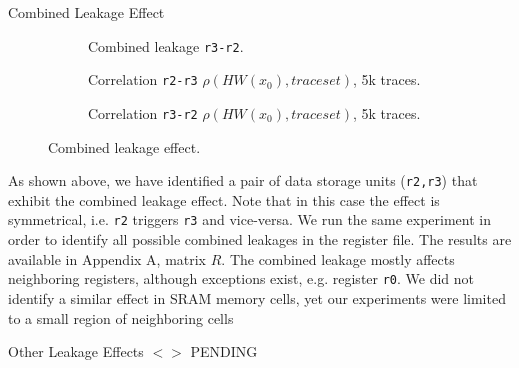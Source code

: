 \begin{subsection}{Combined Leakage Effect}
\begin{figure}[H]
\begin{subfigure}[b]{0.4\textwidth}
        \caption{\scriptsize{Combined leakage \texttt{r3-r2}.}}

    \end{subfigure}


 \begin{subfigure}[b]{0.47\textwidth}

        \caption{\scriptsize{Correlation \texttt{r2-r3} $\rho(HW(x_0),traceset)$, 5k traces.}}

    \end{subfigure}
 \begin{subfigure}[b]{0.47\textwidth}

        \caption{\scriptsize{Correlation \texttt{r3-r2} $\rho(HW(x_0),traceset)$, 5k traces.}}

    \end{subfigure}

   
    \caption{Combined leakage effect.}\label{fig:regleak}
\end{figure}


\end{subsection}
As shown above, we have identified a pair of data storage units (\texttt{r2,r3}) that exhibit the combined leakage effect. Note that in this case the effect is symmetrical, i.e. \texttt{r2} triggers \texttt{r3} and vice-versa. We run the same experiment in order to identify all possible combined leakages in the register file. The results are available in Appendix A, matrix $R$. The combined leakage mostly affects neighboring registers, although exceptions exist, e.g. register \texttt{r0}. We did not identify a similar effect in SRAM memory cells, yet our experiments were limited to a small region of neighboring cells 

\begin{subsection}{Other Leakage Effects}
$<>$ PENDING\\

\end{subsection}


